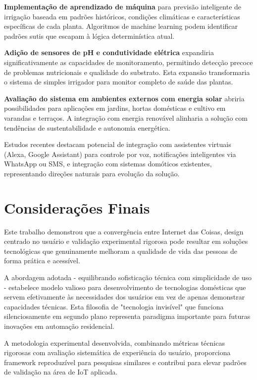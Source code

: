 \textbf{Implementação de aprendizado de máquina} para previsão inteligente de irrigação baseada em padrões históricos, condições climáticas e características específicas de cada planta. Algoritmos de machine learning podem identificar padrões sutis que escapam à lógica determinística atual.

\textbf{Adição de sensores de pH e condutividade elétrica} expandiria significativamente as capacidades de monitoramento, permitindo detecção precoce de problemas nutricionais e qualidade do substrato. Esta expansão transformaria o sistema de simples irrigador para monitor completo de saúde das plantas.

\textbf{Avaliação do sistema em ambientes externos com energia solar} abriria possibilidades para aplicações em jardins, hortas domésticas e cultivo em varandas e terraços. A integração com energia renovável alinharia a solução com tendências de sustentabilidade e autonomia energética.

Estudos recentes \cite{future2024} destacam potencial de integração com assistentes virtuais (Alexa, Google Assistant) para controle por voz, notificações inteligentes via WhatsApp ou SMS, e integração com sistemas domóticos existentes, representando direções naturais para evolução da solução.

\section{Considerações Finais}

Este trabalho demonstrou que a convergência entre Internet das Coisas, design centrado no usuário e validação experimental rigorosa pode resultar em soluções tecnológicas que genuinamente melhoram a qualidade de vida das pessoas de forma prática e acessível.

A abordagem adotada - equilibrando sofisticação técnica com simplicidade de uso - estabelece modelo valioso para desenvolvimento de tecnologias domésticas que servem efetivamente às necessidades dos usuários em vez de apenas demonstrar capacidades técnicas. Esta filosofia de "tecnologia invisível" que funciona silenciosamente em segundo plano representa paradigma importante para futuras inovações em automação residencial.

A metodologia experimental desenvolvida, combinando métricas técnicas rigorosas com avaliação sistemática de experiência do usuário, proporciona framework reproduzível para pesquisas similares e contribui para elevar padrões de validação na área de IoT aplicada.

